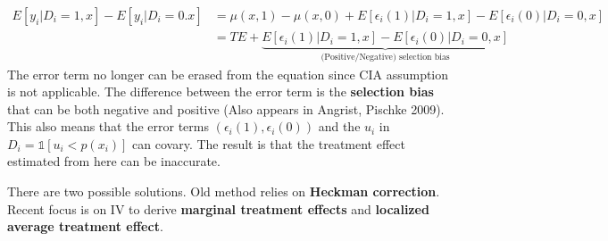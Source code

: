 \documentclass[12pt]{article}
\theoremstyle{definition}
\theoremstyle{property}
\theoremstyle{assumption}
\theoremstyle{example}
\theoremstyle{comment}
\begin{document}
\begin{align*}
E[y_i|D_i=1,x]-E[y_i|D_i=0.x]&=\mu(x,1)-\mu(x,0)+E[\epsilon_i(1)|D_i=1,x]-E[\epsilon_i(0)|D_i=0,x]\\
&=TE+\underbrace{E[\epsilon_i(1)|D_i=1,x]-E[\epsilon_i(0)|D_i=0,x]}_{\text{(Positive/Negative) selection bias}}
\end{align*}
The error term no longer can be erased from the equation since CIA assumption is not applicable. The difference between the error term is the \textbf{selection bias} that can be both negative and positive (Also appears in Angrist, Pischke 2009). This also means that the error terms $(\epsilon_i(1), \epsilon_i(0))$ and the $u_i$ in $D_i=\mathbb{1}[u_i<p(x_i)]$ can covary. The result is that the treatment effect estimated from here can be inaccurate. \par
There are two possible solutions. Old method relies on \textbf{Heckman correction}. Recent focus is on IV to derive \textbf{marginal treatment effects} and \textbf{localized average treatment effect}.
\end{document}
